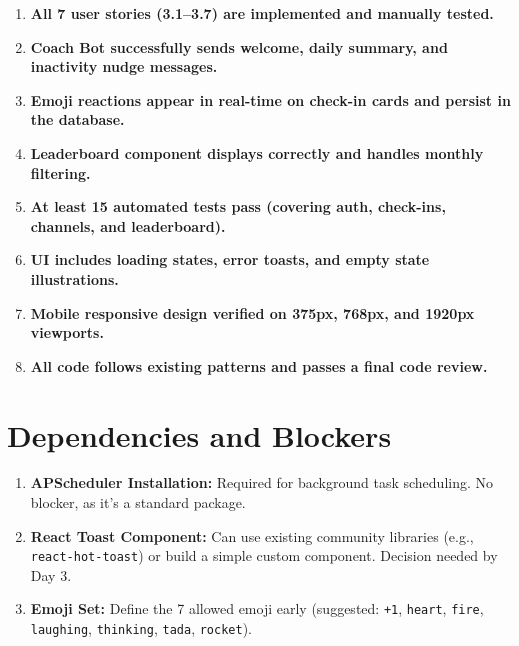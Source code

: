 \documentclass[11pt]{article}
\begin{document}
\begin{enumerate}[leftmargin=1.5em]
    \item \textbf{All 7 user stories (3.1--3.7) are implemented and manually tested.}

    \item \textbf{Coach Bot successfully sends welcome, daily summary, and inactivity nudge messages.}

    \item \textbf{Emoji reactions appear in real-time on check-in cards and persist in the database.}

    \item \textbf{Leaderboard component displays correctly and handles monthly filtering.}

    \item \textbf{At least 15 automated tests pass (covering auth, check-ins, channels, and leaderboard).}

    \item \textbf{UI includes loading states, error toasts, and empty state illustrations.}

    \item \textbf{Mobile responsive design verified on 375px, 768px, and 1920px viewports.}

    \item \textbf{All code follows existing patterns and passes a final code review.}
\end{enumerate}

\section{Dependencies and Blockers}

\begin{enumerate}[leftmargin=1.5em]
    \item \textbf{APScheduler Installation:} Required for background task scheduling. No blocker, as it's a standard package.

    \item \textbf{React Toast Component:} Can use existing community libraries (e.g., \texttt{react-hot-toast}) or build a simple custom component. Decision needed by Day 3.

    \item \textbf{Emoji Set:} Define the 7 allowed emoji early (suggested: \texttt{+1}, \texttt{heart}, \texttt{fire}, \texttt{laughing}, \texttt{thinking}, \texttt{tada}, \texttt{rocket}).
\end{enumerate}
\end{document}
